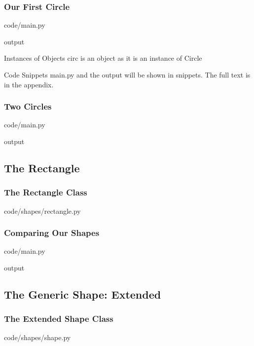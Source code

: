 \documentclass{beamer}
\newcommand{\closenewline}{%
  \par\nopagebreak
  \vspace{-\itemsep}
  \vspace{-\parsep}
}
\begin{document}
  \begin{frame}
    \frametitle{Our First Circle}

    code/main.py
    

    output
    
    \begin{block}{Instances of Objects}
      circ is an object as it is an instance of Circle
    \end{block}

    \begin{block}{Code Snippets}
      main.py and the output will be shown in snippets.
      The full text is in the appendix.
    \end{block}
  \end{frame}

  \begin{frame}
    \frametitle{Two Circles}

    code/main.py
    

    output
    
  \end{frame}


\subsection{The Rectangle}
  \begin{frame}
    \frametitle{The Rectangle Class}
    code/shapes/rectangle.py
    
  \end{frame}

  \begin{frame}
    \frametitle{Comparing Our Shapes}

    code/main.py
    
    \closenewline
    

    output
    
    \closenewline
    
  \end{frame}

\subsection{The Generic Shape: Extended}
  \begin{frame}
    \frametitle{The Extended Shape Class}
    code/shapes/shape.py
    
  \end{frame}
\end{document}
